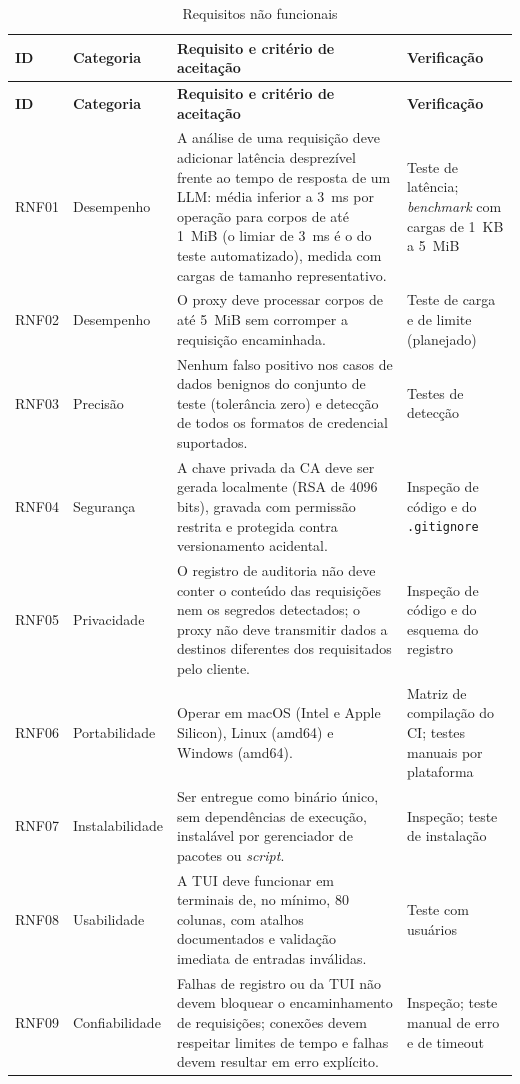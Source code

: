 {\small
\begin{longtable}{|p{1.35cm}|p{2.3cm}|p{6.1cm}|p{3.4cm}|}
\caption{Requisitos não funcionais}\label{tab:rnf}\\
\hline
\textbf{ID} & \textbf{Categoria} & \textbf{Requisito e critério de aceitação} & \textbf{Verificação} \\ \hline
\endfirsthead
\hline
\textbf{ID} & \textbf{Categoria} & \textbf{Requisito e critério de aceitação} & \textbf{Verificação} \\ \hline
\endhead
RNF01 & Desempenho & A análise de uma requisição deve adicionar latência desprezível frente ao tempo de resposta de um LLM: média inferior a 3~ms por operação para corpos de até 1~MiB (o limiar de 3~ms é o do teste automatizado), medida com cargas de tamanho representativo. & Teste de latência; \textit{benchmark} com cargas de 1~KB a 5~MiB \\ \hline
RNF02 & Desempenho & O proxy deve processar corpos de até 5~MiB sem corromper a requisição encaminhada. & Teste de carga e de limite (planejado) \\ \hline
RNF03 & Precisão & Nenhum falso positivo nos casos de dados benignos do conjunto de teste (tolerância zero) e detecção de todos os formatos de credencial suportados. & Testes de detecção \\ \hline
RNF04 & Segurança & A chave privada da CA deve ser gerada localmente (RSA de 4096 bits), gravada com permissão restrita e protegida contra versionamento acidental. & Inspeção de código e do \texttt{.gitignore} \\ \hline
RNF05 & Privacidade & O registro de auditoria não deve conter o conteúdo das requisições nem os segredos detectados; o proxy não deve transmitir dados a destinos diferentes dos requisitados pelo cliente. & Inspeção de código e do esquema do registro \\ \hline
RNF06 & Portabilidade & Operar em macOS (Intel e Apple Silicon), Linux (amd64) e Windows (amd64). & Matriz de compilação do CI; testes manuais por plataforma \\ \hline
RNF07 & Instalabilidade & Ser entregue como binário único, sem dependências de execução, instalável por gerenciador de pacotes ou \textit{script}. & Inspeção; teste de instalação \\ \hline
RNF08 & Usabilidade & A TUI deve funcionar em terminais de, no mínimo, 80 colunas, com atalhos documentados e validação imediata de entradas inválidas. & Teste com usuários \\ \hline
RNF09 & Confiabilidade & Falhas de registro ou da TUI não devem bloquear o encaminhamento de requisições; conexões devem respeitar limites de tempo e falhas devem resultar em erro explícito. & Inspeção; teste manual de erro e de timeout \\ \hline

\end{longtable}}
